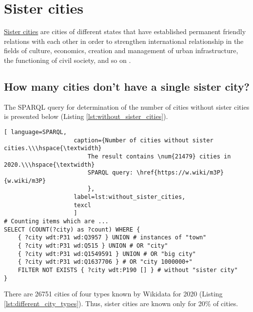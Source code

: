 \section{Sister cities}

\href{https://en.wikipedia.org/wiki/Sister_city}{Sister cities} are cities of different states that have established permanent friendly relations with each other in order to strengthen international relationship in the fields of culture, economics, creation and management of urban infrastructure, the functioning of civil society, and so on .

\subsection{How many cities don't have a single sister city?}

The SPARQL query for determination of the number of cities without sister cities is presented below (Listing \ref{lst:without_sister_cities}).

\begin{lstlisting}[ language=SPARQL, 
                    caption={Number of cities without sister cities.\\\hspace{\textwidth}
                        The result contains \num{21479} cities in 2020.\\\hspace{\textwidth}
                        SPARQL query: \href{https://w.wiki/m3P}{w.wiki/m3P}
                        },
                    label=lst:without_sister_cities,
                    texcl 
                    ]
# Counting items which are ... 
SELECT (COUNT(?city) as ?count) WHERE {                             
	{ ?city wdt:P31 wd:Q3957 } UNION # instances of "town"          
	{ ?city wdt:P31 wd:Q515 } UNION # OR "city"                 
	{ ?city wdt:P31 wd:Q1549591 } UNION # OR "big city"                       
	{ ?city wdt:P31 wd:Q1637706 } # OR "city 1000000+"              
	FILTER NOT EXISTS { ?city wdt:P190 [] } # without "sister city"
}
\end{lstlisting}%

There are \num{26751} cities of four types known by Wikidata for 2020 (Listing \ref{lst:different_city_types}). Thus, sister cities are known only for 20\% of cities.

